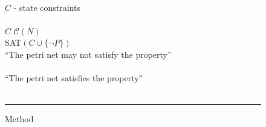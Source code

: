 \begin{figure}[t]
\begin{minipage}[t]{.94\columnwidth}
    \algVars\\
    \tabT $C$ - state constraints \\
    \algBegin\\
    \tabT $C$ \algAssgn $\mathcal C(N)$ \\
    \tabT \algIf SAT$(C \cup \{\neg P\})$ \algThen \\
    \tabTT \algReturn ``The petri net may not satisfy the property'' \\
    \tabT \algElse \\
    \tabTT \algReturn ``The petri net satisfies the property'' \\
    \tabT \algFi \\
    \algEnd
  \end{minipage}
  \vspace{1.5ex}
  \hrule
  \caption{Method \safety}
  \label{fig_method_safety}
\end{figure}

